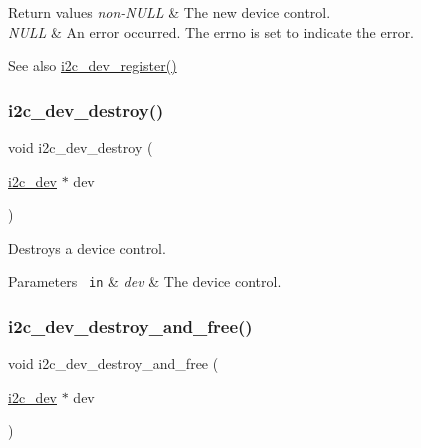 \begin{DoxyRetVals}{Return values}
{\em non-\/\+N\+U\+LL} & The new device control. \\
\hline
{\em N\+U\+LL} & An error occurred. The errno is set to indicate the error.\\
\hline
\end{DoxyRetVals}
\begin{DoxySeeAlso}{See also}
\mbox{\hyperlink{group__I2CDevice_ga917604be9f6cfaa0e4d7a9302e873d16}{i2c\+\_\+dev\+\_\+register()}} 
\end{DoxySeeAlso}
\mbox{\label{group__I2CDevice_ga2ed20633d6ded213b3f06ca56db211c6}} 
\subsubsection{\texorpdfstring{i2c\_dev\_destroy()}{i2c\_dev\_destroy()}}
{\footnotesize\ttfamily void i2c\+\_\+dev\+\_\+destroy (\begin{DoxyParamCaption}\item[{\mbox{\hyperlink{structi2c__dev}{i2c\+\_\+dev}} $\ast$}]{dev }\end{DoxyParamCaption})}



Destroys a device control. 


\begin{DoxyParams}[1]{Parameters}
\mbox{\texttt{ in}}  & {\em dev} & The device control. \\
\hline
\end{DoxyParams}
\mbox{\label{group__I2CDevice_gabb0478e95d721b85cc8e06bd2be89559}} 
\subsubsection{\texorpdfstring{i2c\_dev\_destroy\_and\_free()}{i2c\_dev\_destroy\_and\_free()}}
{\footnotesize\ttfamily void i2c\+\_\+dev\+\_\+destroy\+\_\+and\+\_\+free (\begin{DoxyParamCaption}\item[{\mbox{\hyperlink{structi2c__dev}{i2c\+\_\+dev}} $\ast$}]{dev }\end{DoxyParamCaption})}



